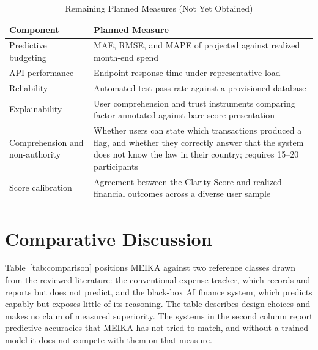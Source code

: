 \documentclass[conference]{IEEEtran}
\begin{document}
\begin{table}[!t]
\centering
\caption{Remaining Planned Measures (Not Yet Obtained)}
\label{tab:futuremetrics}
\footnotesize
\renewcommand{\arraystretch}{1.3}
\begin{tabular}{|p{2.8cm}|p{4.7cm}|}
\hline
\textbf{Component} & \textbf{Planned Measure} \\
\hline
Predictive budgeting & MAE, RMSE, and MAPE of projected against realized month-end spend \\
\hline
API performance & Endpoint response time under representative load \\
\hline
Reliability & Automated test pass rate against a provisioned database \\
\hline
Explainability & User comprehension and trust instruments comparing factor-annotated against bare-score presentation \\
\hline
Comprehension and non-authority & Whether users can state which transactions produced a flag, and whether they correctly answer that the system does not know the law in their country; requires 15--20 participants \\
\hline
Score calibration & Agreement between the Clarity Score and realized financial outcomes across a diverse user sample \\
\hline
\end{tabular}
\end{table}

\section{Comparative Discussion}

Table~\ref{tab:comparison} positions MEIKA against two reference classes drawn from the reviewed literature: the conventional expense tracker, which records and reports but does not predict, and the black-box AI finance system, which predicts capably but exposes little of its reasoning. The table describes design choices and makes no claim of measured superiority. The systems in the second column report predictive accuracies that MEIKA has not tried to match, and without a trained model it does not compete with them on that measure.
\end{document}
